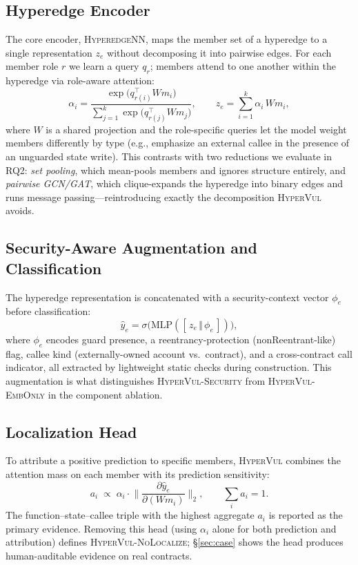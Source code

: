 \documentclass[conference]{IEEEtran}
\newcommand{\hypervul}{\textsc{HyperVul}}
\newcommand{\hyperedgenn}{\textsc{HyperedgeNN}}
\begin{document}
\subsection{Hyperedge Encoder}
\label{sec:encoder}
The core encoder, \hyperedgenn{}, maps the member set of a hyperedge to a single
representation $z_e$ without decomposing it into pairwise edges. For each member role
$r$ we learn a query $q_r$; members attend to one another within the hyperedge via
role-aware attention:
\begin{equation}
\alpha_i = \frac{\exp\!\big(q_{r(i)}^{\top} W m_i\big)}
                {\sum_{j=1}^{k}\exp\!\big(q_{r(j)}^{\top} W m_j\big)},
\qquad
z_e = \sum_{i=1}^{k} \alpha_i\, W m_i ,
\label{eq:attn}
\end{equation}
where $W$ is a shared projection and the role-specific queries let the model weight
members differently by type (e.g., emphasize an external callee in the presence of an
unguarded state write). This contrasts with two reductions we evaluate in RQ2:
\emph{set pooling}, which mean-pools members and ignores structure entirely, and
\emph{pairwise GCN/GAT}, which clique-expands the hyperedge into binary edges and runs
message passing---reintroducing exactly the decomposition \hypervul{} avoids.

\subsection{Security-Aware Augmentation and Classification}
The hyperedge representation is concatenated with a security-context vector
$\phi_e$ before classification:
\begin{equation}
\hat{y}_e = \sigma\!\big(\mathrm{MLP}([\,z_e \,\Vert\, \phi_e\,])\big),
\label{eq:clf}
\end{equation}
where $\phi_e$ encodes guard presence, a reentrancy-protection (nonReentrant-like)
flag, callee kind (externally-owned account vs.\ contract), and a cross-contract call
indicator, all extracted by lightweight static checks during construction. This
augmentation is what distinguishes \textsc{HyperVul-Security} from
\textsc{HyperVul-EmbOnly} in the component ablation.

\subsection{Localization Head}
\label{sec:loc}
To attribute a positive prediction to specific members, \hypervul{} combines the
attention mass on each member with its prediction sensitivity:
\begin{equation}
a_i \;\propto\; \alpha_i \cdot
   \Big\lVert \frac{\partial \hat{y}_e}{\partial (W m_i)} \Big\rVert_2,
   \qquad \textstyle\sum_i a_i = 1 .
\label{eq:loc}
\end{equation}
The function--state--callee triple with the highest aggregate $a_i$ is reported as the
primary evidence. Removing this head (using $\alpha_i$ alone for both prediction and
attribution) defines \textsc{HyperVul-NoLocalize}; \S\ref{sec:case} shows the head
produces human-auditable evidence on real contracts.
\end{document}
